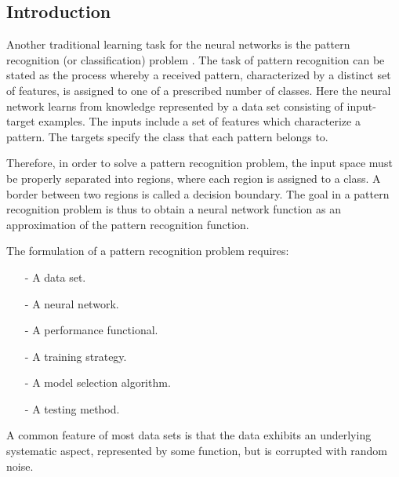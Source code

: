 
\subsection*{Introduction}

Another traditional learning task for the neural networks is the pattern recognition (or classification) problem \cite{Bishop1995}. 
The task of pattern recognition can be stated as the process whereby a received pattern, characterized by a distinct set of features, 
is assigned to one of a prescribed number of classes. 
Here the neural network learns from
knowledge represented by a data set consisting of input-target examples.
The inputs include a set of features which characterize a pattern. The targets specify
the class that each pattern belongs to.

Therefore, in order to solve a pattern recognition problem, the input space must
be properly separated into regions, where each region is assigned to a class. A border
between two regions is called a decision boundary. The goal in a pattern recognition problem 
 is thus to obtain a neural network function as an
approximation of the pattern recognition function.


The formulation of a pattern recognition problem requires:

\begin{itemize}
\item[-] A data set. 
\item[-] A neural network.
\item[-] A performance functional.
\item[-] A training strategy.
\item[-] A model selection algorithm.
\item[-] A testing method.
\end{itemize}

A common feature of most data sets is that the data
exhibits an underlying systematic aspect, represented by some
function, but is corrupted with random noise. 

